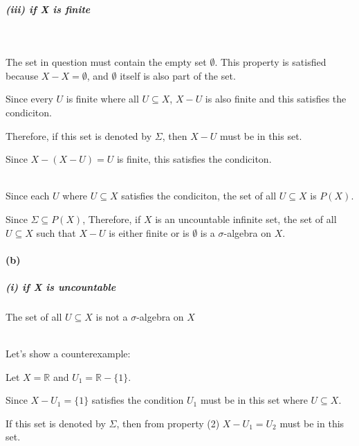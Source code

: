 \documentclass[12pt]{article}
\begin{document}
\subparagraph{(iii) if X is finite}
\ \\
\par \hspace*{1em}The set in question must contain the empty set \( \emptyset \). This property is satisfied because \( X - X = \emptyset \), and \( \emptyset \) itself is also part of the set. \\
\par \hspace*{1em}Since every \(U\) is finite where all \( U \subseteq X \), \(X-U\) is also finite and this satisfies the condiciton. \\
\par \hspace*{1em}Therefore, if this set is denoted by \( \Sigma \), then \( X-U \) must be in this set. \\
\par \hspace*{1em}Since \( X - (X-U) = U\) is finite, this satisfies the condiciton. \\ \\

\par \hspace*{1em}Since each \( U \) where \( U \subseteq X \) satisfies the condiciton, the set of all \( U \subseteq X \) is \( P(X) \). \\
\par \hspace*{1em}Since \( \Sigma \subseteq P(X) \), Therefore, if \( X \) is an uncountable infinite set, the set of all \( U \subseteq X \) such that \( X - U \) is either finite or is \(\emptyset\) is a \( \sigma \)-algebra on \( X \).


\paragraph{(b)}
\subparagraph{(i) if X is uncountable}
The set of all \( U \subseteq X \) is not a \(\sigma\)-algebra on \(X\) \\ \\
\par \hspace*{1em}Let's show a counterexample: \\
\par \hspace*{1em}Let \( X = \mathbb{R} \) and \( U_1 = \mathbb{R} - \{1\} \). \\
\par \hspace*{1em}Since \( X - U_1 = \{1\} \) satisfies the condition \( U_1 \) must be in this set where \( U \subseteq X \).\\
\par \hspace*{1em}If this set is denoted by \( \Sigma \), then from property (2) \( X - U_1 = U_2 \) must be in this set.\\
\end{document}

